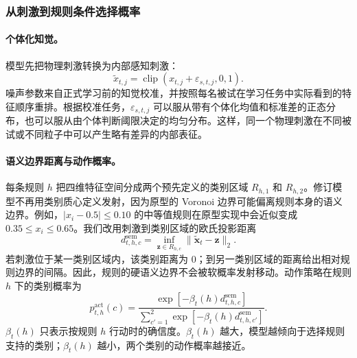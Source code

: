 \subsubsection{从刺激到规则条件选择概率}

\paragraph{个体化知觉。}
模型先把物理刺激转换为内部感知刺激：
\begin{equation}
\widetilde x_{t,j}
=\operatorname{clip}(x_{t,j}+\varepsilon_{s,t,j},0,1).
\label{eq:dynamic-perception}
\end{equation}
噪声参数来自正式学习前的知觉校准，并按照每名被试在学习任务中实际看到的特征顺序重排。根据校准任务，$\varepsilon_{s,t,j}$ 可以服从带有个体化均值和标准差的正态分布，也可以服从由个体判断阈限决定的均匀分布。这样，同一个物理刺激在不同被试或不同粒子中可以产生略有差异的内部表征。

\paragraph{语义边界距离与动作概率。}
每条规则 $h$ 把四维特征空间分成两个预先定义的类别区域 $R_{h,1}$ 和 $R_{h,2}$。修订模型不再用类别质心定义发射，因为原型的 Voronoi 边界可能偏离规则本身的语义边界。例如，$|x_i-0.5|\leq0.10$ 的中等值规则在原型实现中会近似变成 $0.35\leq x_i\leq0.65$。我们改用刺激到类别区域的欧氏投影距离
\begin{equation}
d^{\mathrm{sem}}_{t,h,c}
=\inf_{\mathbf z\in R_{h,c}}
\lVert\widetilde{\mathbf x}_t-\mathbf z\rVert_2.
\label{eq:dynamic-semantic-distance}
\end{equation}
若刺激位于某一类别区域内，该类别距离为 0；到另一类别区域的距离给出相对规则边界的间隔。因此，规则的硬语义边界不会被软概率发射移动。动作策略在规则 $h$ 下的类别概率为
\begin{equation}
p^{\mathrm{act}}_{t,h}(c)
=
\frac{\exp[-\beta_t(h)d^{\mathrm{sem}}_{t,h,c}]}
{\sum_{c'=1}^{2}\exp[-\beta_t(h)d^{\mathrm{sem}}_{t,h,c'}]}.
\label{eq:dynamic-rule-choice}
\end{equation}
$\beta_t(h)$ 只表示按规则 $h$ 行动时的确信度。$\beta_t(h)$ 越大，模型越倾向于选择规则支持的类别；$\beta_t(h)$ 越小，两个类别的动作概率越接近。

